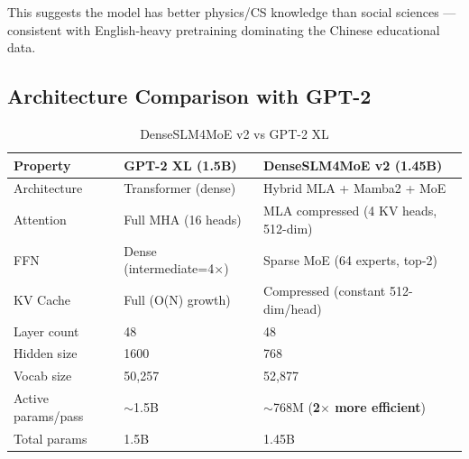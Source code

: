 This suggests the model has better physics/CS knowledge than social sciences --- consistent with English-heavy pretraining dominating the Chinese educational data.

\subsection{Architecture Comparison with GPT-2}

\begin{table}[h]
    \centering
    \caption{DenseSLM4MoE v2 vs GPT-2 XL}
    \begin{tabular}{lll}
        \toprule
        \textbf{Property} & \textbf{GPT-2 XL (1.5B)} & \textbf{DenseSLM4MoE v2 (1.45B)} \\
        \midrule
        Architecture & Transformer (dense) & Hybrid MLA + Mamba2 + MoE \\
        Attention & Full MHA (16 heads) & MLA compressed (4 KV heads, 512-dim) \\
        FFN & Dense (intermediate=4$\times$) & Sparse MoE (64 experts, top-2) \\
        KV Cache & Full (O(N) growth) & Compressed (constant 512-dim/head) \\
        Layer count & 48 & 48 \\
        Hidden size & 1600 & 768 \\
        Vocab size & 50,257 & 52,877 \\
        Active params/pass & $\sim$1.5B & $\sim$768M (\textbf{2$\times$ more efficient}) \\
        Total params & 1.5B & 1.45B \\
        \bottomrule
    \end{tabular}
\end{table}
